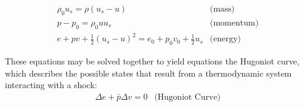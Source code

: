 \documentclass[twocolumn,10pt]{asme2ej}
\begin{document}
\[\begin{array}{*{20}{c}}
	{{\rho _0}{u_s} = \rho \left( {{u_s} - u} \right)}&{\text{(mass)}}\\
	{p - {p_0} = {\rho _0}u{u_s}}&{\text{(momentum)}}\\
	{e + pv + \frac{1}{2}{{\left( {{u_s} - u} \right)}^2} = {e_0} + {p_0}{v_0} + \frac{1}{2}{u_s}}&{\text{(energy)}}
\end{array}\]

These equations may be solved together to yield equations the Hugoniot curve, which describes the possible states that result from a thermodynamic system interacting with a shock\cite{RN818}:
\[\begin{array}{*{20}{c}}
	{\Delta e + \bar p\Delta v = 0}&{\text{(Hugoniot Curve)}}
\end{array}\]
\end{document}
